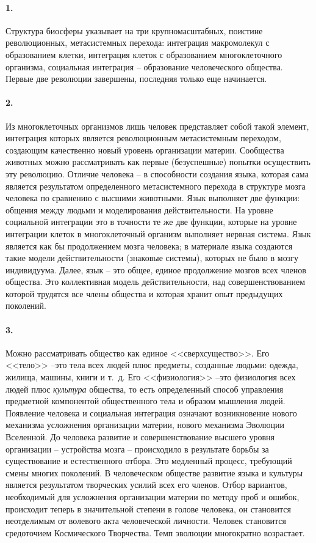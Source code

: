 \documentclass{book}
\begin{document}
\paragraph{1.} Структура биосферы указывает на три крупномасштабных, поистине революционных, метасистемных перехода: интеграция макромолекул с образованием клетки, интеграция клеток с образованием многоклеточного организма, социальная интеграция -- образование человеческого общества. Первые две революции завершены, последняя только еще начинается.

\paragraph{2.} Из многоклеточных организмов лишь человек представляет собой такой элемент, интеграция которых является революционным метасистемным переходом, создающим качественно новый уровень организации материи. Сообщества животных можно рассматривать как первые (безуспешные) попытки осуществить эту революцию. Отличие человека -- в способности создания языка, которая сама является результатом определенного метасистемного перехода в структуре мозга человека по сравнению с высшими животными. Язык выполняет две функции: общения между людьми и моделирования действительности. На уровне социальной интеграции это в точности те же две функции, которые на уровне интеграции клеток в многоклеточный организм выполняет нервная система. Язык является как бы продолжением мозга человека; в материале языка создаются такие модели действительности (знаковые системы), которых не было в мозгу индивидуума. Далее, язык -- это общее, единое продолжение мозгов всех членов общества. Это коллективная модель действительности, над 
совершенствованием которой трудятся все члены общества и которая хранит опыт предыдущих поколений.

\paragraph{3.} Можно рассматривать общество как единое <<сверхсущество>>. Его <<тело>> --это тела всех людей плюс предметы, созданные людьми: одежда, жилища, машины, книги и т.~д. Его <<физиология>> --это физиология всех людей плюс \textit{культура}  общества, то есть определенный способ управления предметной компонентой общественного тела и образом мышления людей. Появление человека и социальная интеграция означают возникновение нового механизма усложнения организации материи, нового механизма Эволюции Вселенной. До человека развитие и совершенствование высшего уровня организации -- устройства мозга -- происходило в результате борьбы за существование и естественного отбора. Это медленный процесс, требующий смены многих поколений. В человеческом обществе развитие языка и культуры является результатом творческих усилий всех его членов. Отбор вариантов, необходимый для усложнения организации материи по методу проб и ошибок, происходит теперь в значительной степени в голове человека, он становится неотделимым от 
волевого 
акта человеческой личности. Человек становится средоточием Космического Творчества. Темп эволюции многократно возрастает.
\end{document}
